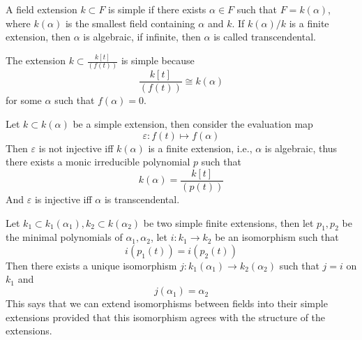 \documentclass[openany]{book}
\begin{document}
\begin{defn}
    A field extension $k\subset F$ is simple if there exists $\alpha\in F$ such that $F=k(\alpha)$, where $k(\alpha)$ is the smallest field containing $\alpha$ and $k$. If $k(\alpha)/k$ is a finite extension, then $\alpha$ is algebraic, if infinite, then $\alpha$ is called transcendental.
\end{defn}

\begin{example}
    The extension $k\subset\frac{k[t]}{(f(t))}$ is simple because 
    \begin{equation*}
        \frac{k[t]}{(f(t))}\cong k(\alpha)
    \end{equation*}
    for some $\alpha$ such that $f(\alpha)=0$.
\end{example}




\begin{prop}
    Let $k\subset k(\alpha)$ be a simple extension, then consider the evaluation map 
    \begin{equation*}
        \varepsilon: f(t)\mapsto f(\alpha)
    \end{equation*}
    Then $\varepsilon$ is not injective iff $k(\alpha)$ is a finite extension, i.e., $\alpha$ is algebraic, thus there exists a monic irreducible polynomial $p$ such that 
    \begin{equation*}
        k(\alpha)=\frac{k[t]}{(p(t))}
    \end{equation*}
    And $\varepsilon$ is injective iff $\alpha$ is transcendental.
\end{prop}


\begin{prop}[lifting]
    Let $k_1\subset k_1(\alpha_1), k_2\subset k(\alpha_2)$ be two simple finite extensions, then let $p_1,p_2$ be the minimal polynomials of $\alpha_1,\alpha_2$, let $i: k_1\to k_2$ be an isomorphism such that 
    \begin{equation*}
        i(p_1(t))=i(p_2(t))
    \end{equation*}
    Then there exists a unique isomorphism $j: k_1(\alpha_1)\to k_2(\alpha_2)$ such that $j=i$ on $k_1$ and 
    \begin{equation*}
        j(\alpha_1)=\alpha_2
    \end{equation*}
    This says that we can extend isomorphisms between fields into their simple extensions provided that this isomorphism agrees with the structure of the extensions.
\end{prop}
\end{document}
